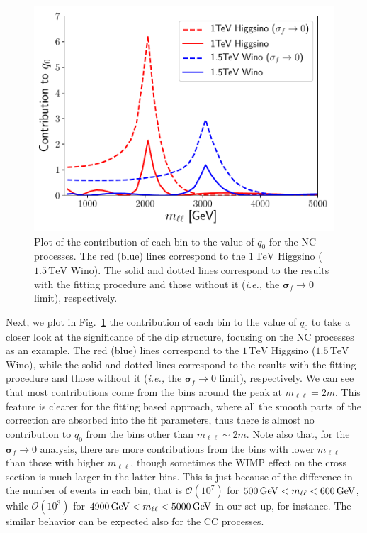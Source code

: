 \documentclass[12pt,twoside,book]{article}
\begin{document}
\begin{figure}[t]
  \centering
  \includegraphics[width=0.495\hsize]{nlo2.pdf}
  \caption{
    Plot of the contribution of each bin to the value of $q_0$ for the NC processes.
    The red (blue) lines correspond to the $1\,\mathrm{TeV}$ Higgsino ($1.5\,\mathrm{TeV}$ Wino).
    The solid and dotted lines correspond to the results with the fitting procedure and those without it (\textit{i.e.,} the $\bm{\sigma}_f \to 0$ limit), respectively.
  }
  \label{fig:nlo2}
\end{figure}

Next, we plot in Fig.~\ref{fig:nlo2} the contribution of each bin to the value of $q_0$ to take a closer look at the significance of the dip structure, focusing on the NC processes as an example.
The red (blue) lines correspond to the $1\,\mathrm{TeV}$ Higgsino ($1.5\,\mathrm{TeV}$ Wino), while the solid and dotted lines correspond to the results with the fitting procedure and those without it (\textit{i.e.,} the $\bm{\sigma}_f \to 0$ limit), respectively.
We can see that most contributions come from the bins around the peak at $m_{\ell\ell} = 2m$.
This feature is clearer for the fitting based approach, where all the smooth parts of the correction are absorbed into the fit parameters, thus there is almost no contribution to $q_0$ from the bins other than $m_{\ell\ell} \sim 2m$.
Note also that, for the $\bm{\sigma}_f \to 0$ analysis, there are more contributions from the bins with lower $m_{\ell\ell}$ than those with higher $m_{\ell\ell}$, though sometimes the WIMP effect on the cross section is much larger in the latter bins.
This is just because of the difference in the number of events in each bin, that is $\mathcal{O}(10^7)$ for $500\,{\rm GeV} < m_{\ell\ell} < 600\,{\rm GeV}$, while $\mathcal{O}(10^3)$ for $4900\,{\rm GeV} < m_{\ell\ell} < 5000\,{\rm GeV}$ in our set up, for instance.
The similar behavior can be expected also for the CC processes.
\end{document}
